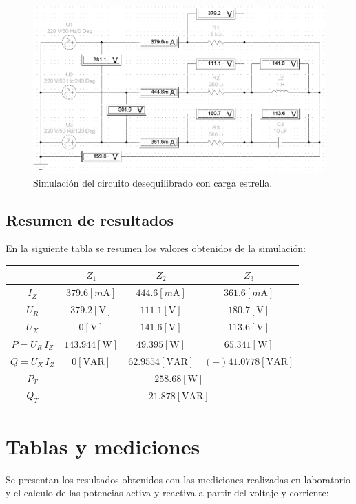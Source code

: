 \documentclass[letter,11pt]{article}
\begin{document}
\begin{figure}[!h]
\centering
\includegraphics[scale=1.00]{simulacion/practica6.1.eps}
\caption{Simulación del circuito desequilibrado con carga estrella.}
\label{simulacion1}
\end{figure}

\subsection{Resumen de resultados}
En la siguiente tabla se resumen los valores obtenidos de la simulación: 

\begin{center}
    \begin{tabular}{|c||c|c|c|}
    \hline
    & \textbf{$Z_1$} & $Z_2$ & $Z_3$
    \tabularnewline \hline \hline
    $I_Z$ &
    $379.6[m\text{A}]$ &
    $444.6[m\text{A}]$ &
    $361.6[m\text{A}]$
    \tabularnewline \hline
    $U_R$ &
    $379.2[\text{V}]$ &
    $111.1[\text{V}]$ &
    $180.7[\text{V}]$
    \tabularnewline \hline
    $U_X$ &
    $0[\text{V}]$ &
    $141.6[\text{V}]$ &
    $113.6[\text{V}]$
    \tabularnewline \hline
    $P=U_R\,I_Z$ &
    $143.944[\text{W}]$ &
    $49.395[\text{W}]$ &
    $65.341[\text{W}]$
    \tabularnewline \hline
    $Q=U_X\,I_Z$ &
    $0[\text{VAR}]$ &
    $62.9554[\text{VAR}]$ &
    $(-)41.0778[\text{VAR}]$
    \tabularnewline \hline
    $P_T$ &
    \multicolumn{3}{|c|}{$258.68[\text{W}]$}
    \tabularnewline \hline
    $Q_T$ &
    \multicolumn{3}{|c|}{$21.878[\text{VAR}]$}
    \tabularnewline \hline
    \end{tabular}
\end{center}

\section{Tablas y mediciones}
Se presentan los resultados obtenidos con las mediciones realizadas en 
laboratorio y el calculo de las potencias activa y reactiva a partir del voltaje
y corriente:
\end{document}
